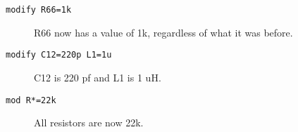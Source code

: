 \begin{description}

\item[{\tt modify R66=1k}] R66 now has a value of 1k, regardless of what it
was before.

\item[{\tt modify C12=220p L1=1u}] C12 is 220 pf and L1 is 1 uH.

\item[{\tt mod R*=22k}] All resistors are now 22k.

\end{description}
